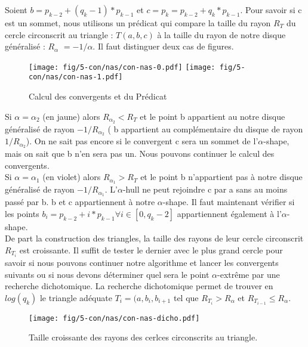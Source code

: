 Soient  $b = p_{k-2} + (q_k - 1) * p_{k-1}$ et $c = p_k = p_{k-2} + q_k * p_{k-1}$. Pour savoir si c est un sommet, nous utilisons un prédicat qui compare la taille du rayon \textbf{$R_T$} du cercle circonscrit au triangle : $T(a, b, c)$ à la taille du rayon de notre disque généralisé : \textbf{$R_{\alpha}$} $= -1/\alpha$. Il faut distinguer deux cas de figures.\\

\begin{figure}[H]
  \centering
  \texttt{[image: fig/5-con/nas/con-nas-0.pdf]}
  \texttt{[image: fig/5-con/nas/con-nas-1.pdf]}
  \caption{Calcul des convergents et du Prédicat}
\end{figure}

Si $\alpha = \alpha_{2}$ (en jaune) alors \textbf{$R_{\alpha_{2}} < R_T$} et le point b appartient au notre disque généralisé de rayon $-1/R_{\alpha_{2}}$ ( b appartient au complémentaire du disque de rayon $1/R_{\alpha_{2}}$). On ne sait pas encore si le convergent c sera un sommet de l'$\alpha$-shape, mais on sait que b n'en sera pas un. Nous pouvons continuer le calcul des convergents.\\ 

Si $\alpha = \alpha_{1}$ (en violet) alors \textbf{$R_{\alpha_{1}} > R_T$} et le point b n'appartient pas à notre disque généralisé de rayon $-1/R_{\alpha_{1}}$. L'$\alpha$-hull ne peut rejoindre c par a sans au moins passé par b. b et c appartiennent à notre $\alpha$-shape. Il faut maintenant vérifier si les points $b_i = p_{k-2} + i*p_{k-1} \forall i \in [0, q_k-2]$ appartiennent également à l'$\alpha$-shape. \\

De part la construction des triangles, la taille des rayons de leur cercle circonscrit $R_{T_{i}}$ est croissante. Il suffit de tester le dernier avec le plus grand cercle pour savoir si nous pouvons continuer notre algorithme et lancer les convergents suivants ou si nous devons déterminer quel sera le point $\alpha$-extrême par une recherche dichotomique. La recherche dichotomique permet de trouver en $log(q_k)$ le triangle adéquate $T_i = (a, b_{i}, b_{i+1}$ tel que $R_{T_i} > R_{\alpha}$ et $R_{T_{i-1}} \leq R_{\alpha}$.

\begin{figure}[H]
  \centering
  \texttt{[image: fig/5-con/nas/con-nas-dicho.pdf]}
  \caption{Taille croissante des rayons des cerlces circonscrits au triangle.}
\end{figure}

